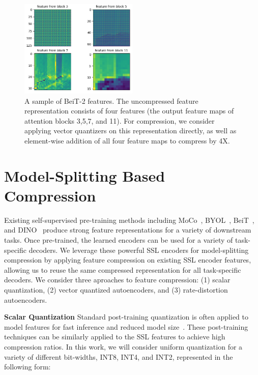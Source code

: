 \documentclass[10pt,twocolumn,letterpaper]{article}
\begin{document}
\begin{figure}
\begin{center}
\includegraphics[width=0.5\textwidth]{Figures/img0_patch0.png}
\end{center}
\caption{\label{fig:beit-features}%
A sample of BeiT-2 features. The uncompressed feature representation consists of four features (the output feature maps of attention blocks 3,5,7, and 11). For compression, we consider applying vector quantizers on this representation directly, as well as element-wise addition of all four feature maps to compress by 4X.}
\end{figure}

\section{Model-Splitting Based Compression}

Existing self-supervised pre-training methods including MoCo~\cite{chen2021empirical}, BYOL~\cite{grill2020bootstrap}, BeiT~\cite{peng2022beit}, and DINO~\cite{oquab2023dinov2} produce strong feature representations for a variety of downstream tasks. Once pre-trained, the learned encoders can be used for a variety of task-specific decoders. We leverage these powerful SSL encoders for model-splitting compression by applying feature compression on existing SSL encoder features, allowing us to reuse the same compressed representation for all task-specific decoders. We consider three aproaches to feature compression: (1) scalar quantization, (2) vector quantized autoencoders, and (3) rate-distortion autoencoders. 

\textbf{Scalar Quantization} Standard post-training quantization is often applied to model features for fast inference and reduced model size~\cite{wu2020integer}. These post-training techniques can be similarly applied to the SSL features to achieve high compression ratios. In this work, we will consider uniform quantization for a variety of different bit-widths, INT8, INT4, and INT2, represented in the following form:
\end{document}
